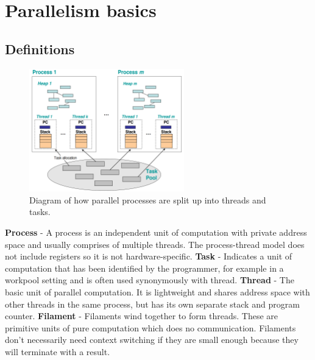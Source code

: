\documentclass[CS4204-Notes.tex]{subfiles}
\begin{document}
\section{Parallelism basics}
\subsection{Definitions}
\begin{figure}[H]
\centering
\includegraphics[width=0.6\textwidth, keepaspectratio]{imgs/terminology.png}
\caption{Diagram of how parallel processes are split up into threads and tasks.}
\end{figure}
\noindent
\textbf{Process} - A process is an independent unit of computation with private address space and usually comprises of multiple threads. The process-thread model does not include registers so it is not hardware-specific. 
\n
\textbf{Task} - Indicates a unit of computation that has been identified by the programmer, for example in a workpool setting and is often used synonymously with thread.
\n
\textbf{Thread} - The basic unit of parallel computation. It is lightweight and shares address space with other threads in the same process, but has its own separate stack and program counter. 
\n
\textbf{Filament} - Filaments wind together to form threads. These are primitive units of pure computation which does no communication. Filaments don't necessarily need context switching if they are small enough because they will terminate with a result. 
\end{document}
